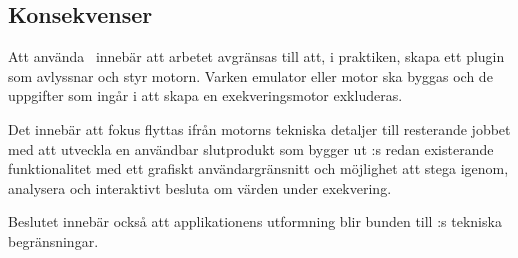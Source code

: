 \subsection{Konsekvenser}

Att använda \stoe\ innebär att arbetet avgränsas till att, i praktiken, skapa
ett plugin som avlyssnar och styr motorn. Varken emulator eller motor ska
byggas och de uppgifter som ingår i att skapa en exekveringsmotor exkluderas.

Det innebär att fokus flyttas ifrån motorns tekniska detaljer till resterande
jobbet med att utveckla en användbar slutprodukt som bygger ut \stoe:s redan
existerande funktionalitet med ett grafiskt användargränsnitt och möjlighet att
stega igenom, analysera och interaktivt besluta om värden under exekvering.

Beslutet innebär också att applikationens utformning blir bunden till \stoe:s
tekniska begränsningar.
